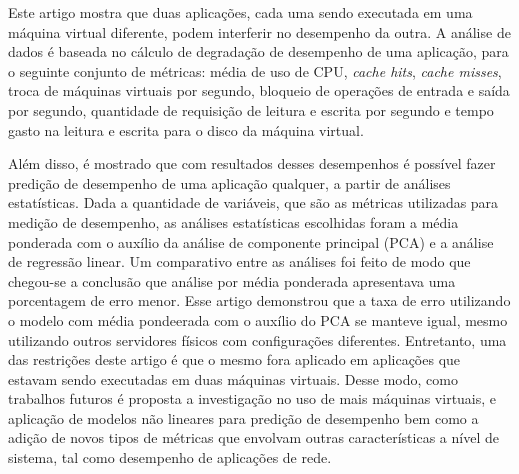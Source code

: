 Este artigo mostra que duas aplicações, cada uma sendo executada em uma máquina virtual diferente, podem interferir no desempenho da outra. A análise de dados é baseada no cálculo de degradação de desempenho de uma aplicação, para o seguinte conjunto de métricas: média de uso de CPU, \textit{cache hits}, \textit{cache misses}, troca de máquinas virtuais por segundo, bloqueio de operações de entrada e saída por segundo, quantidade de requisição de leitura e escrita por segundo e tempo gasto na leitura e escrita para o disco da máquina virtual. %


Além disso, é mostrado que com resultados desses desempenhos é possível fazer predição de desempenho de uma aplicação qualquer, a partir de análises estatísticas. Dada a quantidade de variáveis, que são as métricas utilizadas para medição de desempenho, as análises estatísticas escolhidas foram a média ponderada com o auxílio da análise de componente principal (PCA) e a análise de regressão linear. Um comparativo entre as análises foi feito de modo que chegou-se a conclusão que análise por média ponderada apresentava uma porcentagem de erro menor. Esse artigo demonstrou que a taxa de erro utilizando o modelo com média pondeerada com o auxílio do PCA se manteve igual, mesmo utilizando outros servidores físicos com configurações diferentes. Entretanto, uma das restrições deste artigo é que o mesmo fora aplicado em aplicações que estavam sendo executadas em duas máquinas virtuais. Desse modo, como trabalhos futuros é proposta a investigação no uso de mais máquinas virtuais, e aplicação de modelos não lineares para predição de desempenho bem como a adição de novos tipos de métricas que envolvam outras características a nível de sistema, tal como desempenho de aplicações de rede.

